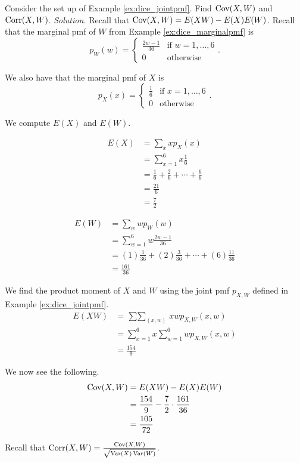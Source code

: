\begin{example}[]
	Consider the set up of Example \ref{ex:dice_jointpmf}. Find $\operatorname{Cov}(X,W)$ and $\operatorname{Corr}(X,W)$.
	\textit{Solution.} Recall that $\operatorname{Cov}(X,W)=E(XW)-E(X)E(W)$.
	Recall that the marginal pmf of $W$ from Example \ref{ex:dice_marginalpmf} is $$p_W(w)=\begin{cases}
		\frac{2w-1}{36} & \text{if $w=1,\hdots, 6$}\\
		0 & \text{otherwise}
	\end{cases}.$$

	We also have that the marginal pmf of $X$ is $$p_X(x)=\begin{cases}
		\frac 16 & \text{if $x=1,\hdots, 6$}\\
		0 & \text{otherwise}\end{cases}.$$

	We compute $E(X)$ and $E(W)$.

	\begin{align*}
		E(X)&=\sum_xxp_X(x)\\
		&=\sum_{x=1}^6x\frac 16\\
		&=\frac 16+\frac 26+\cdots+\frac 66\\
		&=\frac{21}6\\
		&=\frac 72
	\end{align*}

	\begin{align*}
		E(W)&=\sum_wwp_W(w)\\
		&=\sum_{w=1}^6w\frac{2w-1}{36}\\
		&=(1)\frac{1}{36}+(2)\frac{3}{36}+\cdots+(6)\frac{11}{36}\\
		&=\frac{161}{36}
	\end{align*}

	We find the product moment of $X$ and $W$ using the joint pmf $p_{X,W}$ defined in Example \ref{ex:dice_jointpmf}.
	\begin{align*}
		E(XW)&=\mathop{\sum\sum}_{(x,w)}xwp_{X,W}(x,w)\\
		&=\sum_{x=1}^6x\sum_{w=1}^6wp_{X,W}(x,w)\\
		&=\frac{154}{9}
	\end{align*}

	We now see the following.
	\begin{align*}
		\operatorname{Cov}(X,W)&=E(XW)-E(X)E(W)\\
		&=\frac{154}{9}-\frac 72\cdot\frac{161}{36}\\
		&=\frac{105}{72}
	\end{align*}

	Recall that $\operatorname{Corr}(X,W)=\frac{\operatorname{Cov}(X,W)}{\sqrt{\operatorname{Var}(X)\operatorname{Var}(W)}}$.


\end{example}
